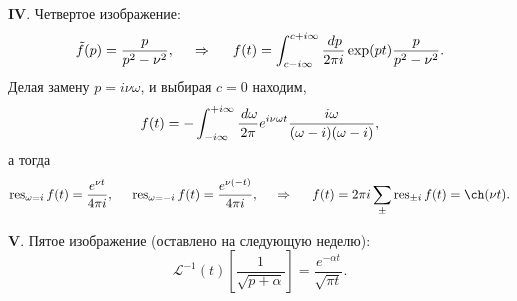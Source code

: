 \textbf{IV}. Четвертое изображение:
\begin{equation*}
    \tilde{f}(p) = \frac{p}{p^2 - \nu^2},
    \hspace{0.5cm} \Rightarrow \hspace{0.5cm}
    f(t) = \int_{c-i \infty}^{c+i \infty} \frac{\, d p}{2 \pi i} \exp(pt) \frac{p}{p^2 - \nu^2}.
\end{equation*}
Делая замену $p = i \nu \omega$, и выбирая $c=0$ находим,
\begin{equation*}
    f(t) = -\int_{-i \infty}^{+i \infty} \frac{\, d \omega}{2\pi} e^{i \nu \omega t} \frac{ i\omega}{( \omega - i)( \omega - i)},
\end{equation*}
а тогда
\begin{equation*}
    \res_{\omega = i} f(t) = \frac{e^{\nu  t}}{4 \pi i},
    \hspace{5 mm} 
    \res_{\omega = -i} f(t)= \frac{e^{\nu  (-t)}}{4 \pi i},
    \hspace{0.5cm} \Rightarrow \hspace{0.5cm}
    f(t) = 2 \pi i \sum_\pm \res_{\pm i} f(t) = \ch(\nu t).
\end{equation*}



\textbf{V}. Пятое изображение (оставлено на следующую неделю):
\begin{equation*}
     \mathcal L^{-1}(t) \left[
        \frac{1}{\sqrt{p + \alpha}}
    \right] = \frac{e^{- \alpha t}}{\sqrt{\pi t}}.
\end{equation*}